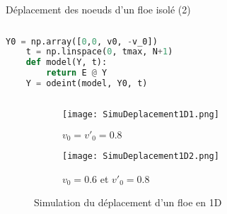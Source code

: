 \begin{frame}[fragile]{Déplacement des noeuds d’un floe isolé (2)}

    \begin{columns}[onlytextwidth]

        \begin{column}{0.5\textwidth}
            \begin{lstlisting}[language=Python,caption=Code de simulation avec Scipy]
    Y0 = np.array([0,0, v0, -v_0])
    t = np.linspace(0, tmax, N+1)
    def model(Y, t):
        return E @ Y
    Y = odeint(model, Y0, t)
            \end{lstlisting}
        \end{column}

    \end{columns}
    

    
    \begin{figure}[!h]
        \centering
        \begin{subfigure}[t]{0.45\textwidth}
            \centering
            \texttt{[image: SimuDeplacement1D1.png]}
            \caption{$v_0=v'_0 = 0.8$}
        \end{subfigure}
        \begin{subfigure}[t]{0.45\textwidth}
            \centering
            \texttt{[image: SimuDeplacement1D2.png]}
            \caption{$v_0= 0.6$ et $v'_0 = 0.8$}
        \end{subfigure}    
        \caption{Simulation du déplacement d'un floe en 1D}
    \end{figure}

\end{frame}




